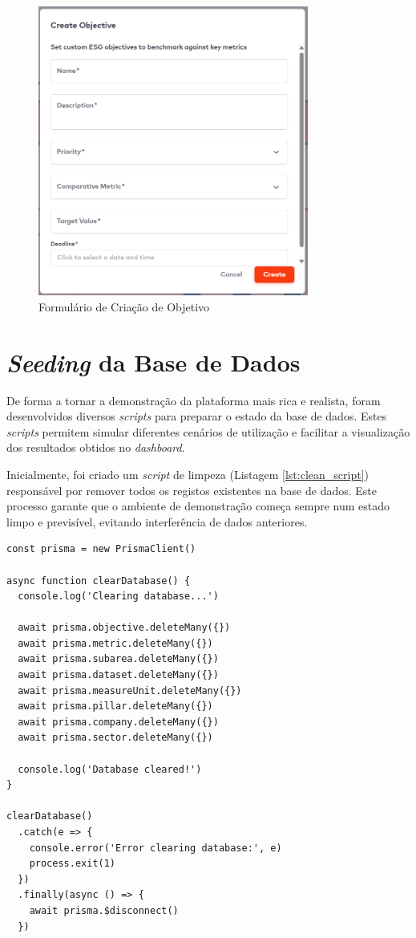 \begin{figure}[H]
    \centering
    \includegraphics[width=3.5in,keepaspectratio]{frontmatter/assets/platform_prints/objetives/objective_creation.png}
    \caption{Formulário de Criação de Objetivo}
    \label{fig:objective_creation}
\end{figure}

\section{\textit{Seeding} da Base de Dados}

De forma a tornar a demonstração da plataforma mais rica e realista, foram desenvolvidos diversos \textit{scripts} para preparar o estado da base de dados. Estes \textit{scripts} permitem simular diferentes cenários de utilização e facilitar a visualização dos resultados obtidos no \textit{dashboard}.

Inicialmente, foi criado um \textit{script} de limpeza (Listagem \ref{lst:clean_script}) responsável por remover todos os registos existentes na base de dados. Este processo garante que o ambiente de demonstração começa sempre num estado limpo e previsível, evitando interferência de dados anteriores.

\begin{lstlisting}[style=customts, caption={\textit{Script} de limpeza da Base de Dados}, label={lst:clean_script}]
const prisma = new PrismaClient()

async function clearDatabase() {
  console.log('Clearing database...')

  await prisma.objective.deleteMany({})
  await prisma.metric.deleteMany({})
  await prisma.subarea.deleteMany({})
  await prisma.dataset.deleteMany({})
  await prisma.measureUnit.deleteMany({})
  await prisma.pillar.deleteMany({})
  await prisma.company.deleteMany({})
  await prisma.sector.deleteMany({})

  console.log('Database cleared!')
}

clearDatabase()
  .catch(e => {
    console.error('Error clearing database:', e)
    process.exit(1)
  })
  .finally(async () => {
    await prisma.$disconnect()
  })
\end{lstlisting}


